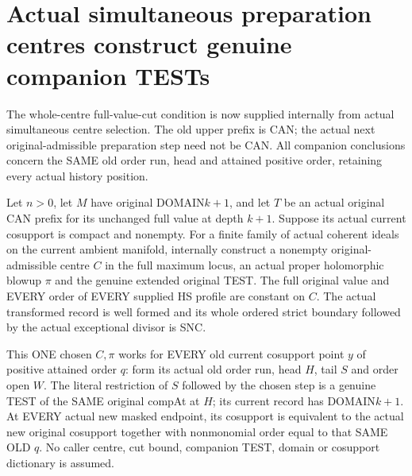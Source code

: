 \section{Actual simultaneous preparation centres construct genuine companion TESTs}

The whole-centre full-value-cut condition is now supplied internally from
actual simultaneous centre selection. The old upper prefix is CAN; the
actual next original-admissible preparation step need not be CAN. All
companion conclusions concern the SAME old order run, head and attained
positive order, retaining every actual history position.

\begin{theorem}
\label{hir:original-current-compact-simultaneous-companion-next-test}
\leanok
Let $n>0$, let $M$ have original DOMAIN$k+1$, and let $T$ be an actual
original CAN prefix for its unchanged full value at depth $k+1$. Suppose
its actual current cosupport is compact and nonempty. For a finite family
of actual coherent ideals on the current ambient manifold, internally
construct a nonempty original-admissible centre $C$ in the full maximum
locus, an actual proper holomorphic blowup $\pi$ and the genuine extended
original TEST. The full original value and EVERY order of EVERY supplied
HS profile are constant on $C$. The actual transformed record is well
formed and its whole ordered strict boundary followed by the actual
exceptional divisor is SNC.

This ONE chosen $C,\pi$ works for EVERY old current cosupport point $y$
of positive attained order $q$: form its actual old order run, head $H$,
tail $S$ and order open $W$. The literal restriction of $S$ followed by the
chosen step is a genuine TEST of the SAME original compAt at $H$; its
current record has DOMAIN$k+1$. At EVERY actual new masked endpoint, its
cosupport is equivalent to the actual new original cosupport together
with nonmonomial order equal to that SAME OLD $q$. No caller centre, cut
bound, companion TEST, domain or cosupport dictionary is assumed.
\end{theorem}
